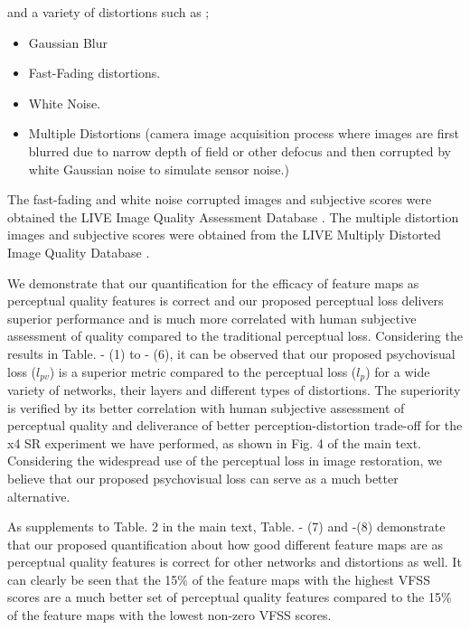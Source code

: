 \documentclass[10pt,twocolumn,letterpaper]{article}
\begin{document}
and a variety of distortions such as ;
\begin{itemize}
 \item{Gaussian Blur} 
 \item Fast-Fading distortions.
 \item White Noise. 
 \item Multiple Distortions (camera image acquisition process where images are first blurred due to narrow depth of field or other defocus and then corrupted by white Gaussian noise to simulate sensor noise.)
\end{itemize}

The fast-fading and white noise corrupted images and subjective scores were obtained the LIVE Image Quality Assessment Database \cite{4}. The multiple distortion images and subjective scores were obtained from the LIVE Multiply Distorted Image Quality Database \cite{36}.

We demonstrate that our quantification for the efficacy of feature maps as perceptual quality features is correct and our proposed perceptual loss delivers superior performance and is much more correlated with human subjective assessment of quality compared to the traditional perceptual loss. Considering the results in Table. - (1) to - (6), it can be observed that our proposed psychovisual loss (\textbf{$l_{pv}$}) is a superior metric compared to the perceptual loss (\textbf{$l_{p}$}) for a wide variety of networks, their layers and different types of distortions. The superiority is verified by its better correlation with human subjective assessment of perceptual quality and deliverance of better perception-distortion trade-off for the x4 SR experiment we have performed, as shown in Fig. 4 of the main text. Considering the widespread use of the perceptual loss in image restoration, we believe that our proposed psychovisual loss can serve as a much better alternative. 

As supplements to Table. 2 in the main text, Table. - (7) and -(8) demonstrate that our proposed quantification about how good different feature maps are as perceptual quality features is correct for other networks and distortions as well. It can clearly be seen that the 15\% of the feature maps with the highest VFSS scores are a much better set of perceptual quality features compared to the 15\% of the feature maps with the lowest non-zero VFSS scores. 
\end{document}

